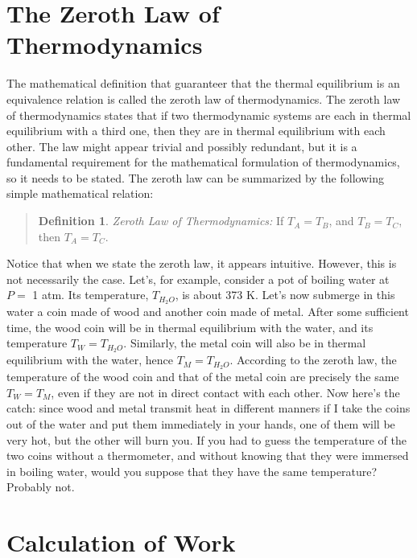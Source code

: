 \documentclass[
  9pt,
]{extbook}
\theoremstyle{definition}
\newtheorem{definition}{Definition}[chapter]
\theoremstyle{definition}
\theoremstyle{definition}
\theoremstyle{remark}
\begin{document}
\hypertarget{the-zeroth-law-of-thermodynamics}{%
\section{The Zeroth Law of Thermodynamics}\label{the-zeroth-law-of-thermodynamics}}

The mathematical definition that guaranteer that the thermal equilibrium is an equivalence relation is called the zeroth law of thermodynamics. The zeroth law of thermodynamics states that if two thermodynamic systems are each in thermal equilibrium with a third one, then they are in thermal equilibrium with each other. The law might appear trivial and possibly redundant, but it is a fundamental requirement for the mathematical formulation of thermodynamics, so it needs to be stated. The zeroth law can be summarized by the following simple mathematical relation:

\begin{quote}
\begin{definition}
\protect\hypertarget{def:zerothlaw}{}{\label{def:zerothlaw} }\emph{Zeroth Law of Thermodynamics:} If \(T_A = T_B\), and \(T_B = T_C\), then \(T_A = T_C\).
\end{definition}
\end{quote}

Notice that when we state the zeroth law, it appears intuitive. However, this is not necessarily the case. Let's, for example, consider a pot of boiling water at \(P=\) 1 atm. Its temperature, \(T_{H_2O}\), is about 373 K. Let's now submerge in this water a coin made of wood and another coin made of metal. After some sufficient time, the wood coin will be in thermal equilibrium with the water, and its temperature \(T_W = T_{H_2O}\). Similarly, the metal coin will also be in thermal equilibrium with the water, hence \(T_M = T_{H_2O}\). According to the zeroth law, the temperature of the wood coin and that of the metal coin are precisely the same \(T_W = T_M\), even if they are not in direct contact with each other. Now here's the catch: since wood and metal transmit heat in different manners if I take the coins out of the water and put them immediately in your hands, one of them will be very hot, but the other will burn you. If you had to guess the temperature of the two coins without a thermometer, and without knowing that they were immersed in boiling water, would you suppose that they have the same temperature? Probably not.

\hypertarget{workint}{%
\section{Calculation of Work}\label{workint}}
\end{document}
